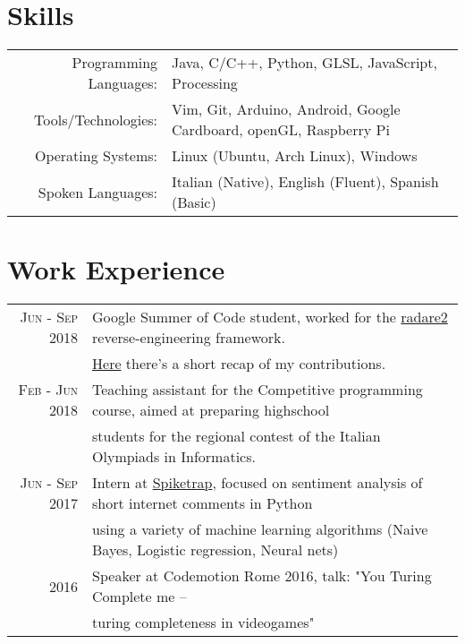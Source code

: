 \documentclass[a4paper,10pt]{article} %
\begin{document}
\bigskip

\section{Skills}
\begin{tabular}{rl}
Programming Languages: & Java, C/C++, Python, GLSL, JavaScript, Processing\\
Tools/Technologies: & Vim, Git, Arduino, Android, Google Cardboard, openGL, Raspberry Pi\\
Operating Systems: & Linux (Ubuntu, Arch Linux), Windows\\
Spoken Languages: & Italian (Native), English (Fluent), Spanish (Basic)\\
\end{tabular}

\bigskip

\section{Work Experience}
    \begin{tabular}{rl}
		\textsc{Jun - Sep  2018}  & Google Summer of Code student, worked for the \href{http://beta.rada.re/en/latest/}{radare2} reverse-engineering
		framework.\\
		 & \href{https://gist.github.com/cyanpencil/27db326bf6f9d2747297fa9b943eb65b#file-gsoc_report_final-md}{Here} there's a short recap of my contributions.  \\
	\textsc{Feb - Jun  2018}  & Teaching assistant for the Competitive programming course, aimed at preparing highschool \\
	     & students for the regional contest of the Italian Olympiads in Informatics.  \\
		\textsc{Jun - Sep  2017} & Intern at \href{http://www.spiketrap.io/}{Spiketrap}, focused on sentiment analysis of short internet comments in Python\\
	     & using a variety of machine learning algorithms (Naive Bayes, Logistic regression, Neural nets) \\
        2016 & Speaker at Codemotion Rome 2016, talk: "You Turing Complete me – \\
	     & turing completeness in videogames"\\
    \end{tabular}
\end{document}
